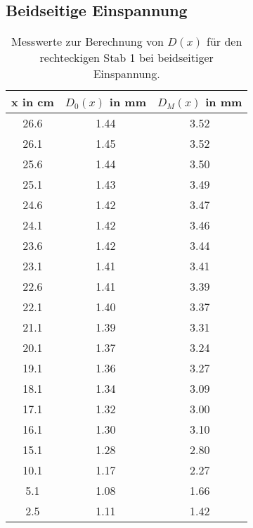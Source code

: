 \subsection{Beidseitige Einspannung}

\begin{table}
  \centering
  \begin{tabular}{c c c}
    \toprule
    x in \si{\centi\meter} & $D_0(x)$ in \si{\milli\meter} & $D_M(x)$ in \si{\milli\meter} \\
    \midrule
    26.6 & 1.44 & 3.52 \\
    26.1 & 1.45 & 3.52 \\
    25.6 & 1.44 & 3.50 \\
    25.1 & 1.43 & 3.49 \\
    24.6 & 1.42 & 3.47 \\
    24.1 & 1.42 & 3.46 \\
    23.6 & 1.42 & 3.44 \\
    23.1 & 1.41 & 3.41 \\
    22.6 & 1.41 & 3.39 \\
    22.1 & 1.40 & 3.37 \\
    21.1 & 1.39 & 3.31 \\
    20.1 & 1.37 & 3.24 \\
    19.1 & 1.36 & 3.27 \\
    18.1 & 1.34 & 3.09 \\
    17.1 & 1.32 & 3.00 \\
    16.1 & 1.30 & 3.10 \\
    15.1 & 1.28 & 2.80 \\
    10.1 & 1.17 & 2.27 \\
    5.1  & 1.08 & 1.66 \\
    2.5  & 1.11 & 1.42 \\
    \bottomrule
  \end{tabular}
  \caption{Messwerte zur Berechnung von $D(x)$ für den rechteckigen Stab 1 bei
  beidseitiger Einspannung.}
  \label{tab:messung3a}
\end{table}

